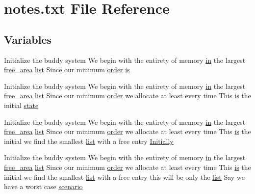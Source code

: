 \hypertarget{notes_8txt}{}\section{notes.\+txt File Reference}
\label{notes_8txt}
\subsection*{Variables}
\begin{DoxyCompactItemize}
\item 
Initialize the buddy system We begin with the entirety of memory \hyperlink{simulator_8c_aca392a8d3941cd0740aef3ad92545d67}{in} the largest \hyperlink{buddy_8c_a6d390a89d1f6c149cef6284d2c0351df}{free\+\_\+area} \hyperlink{notes_8txt_a4ee6db26bad3dd738a9a0384595fe358}{list} Since our minimum \hyperlink{notes_8txt_ae170b788b9ce36849b8a92724a029135}{order} \hyperlink{notes_8txt_afdcba1605c13ab6a6a89a58079be00f2}{is}
\item 
Initialize the buddy system We begin with the entirety of memory \hyperlink{simulator_8c_aca392a8d3941cd0740aef3ad92545d67}{in} the largest \hyperlink{buddy_8c_a6d390a89d1f6c149cef6284d2c0351df}{free\+\_\+area} \hyperlink{notes_8txt_a4ee6db26bad3dd738a9a0384595fe358}{list} Since our minimum \hyperlink{notes_8txt_ae170b788b9ce36849b8a92724a029135}{order} we allocate at least every time This \hyperlink{notes_8txt_afdcba1605c13ab6a6a89a58079be00f2}{is} the initial \hyperlink{notes_8txt_abd9a65452f6ea6a1b99ec30c8a0ef8e4}{state}
\item 
Initialize the buddy system We begin with the entirety of memory \hyperlink{simulator_8c_aca392a8d3941cd0740aef3ad92545d67}{in} the largest \hyperlink{buddy_8c_a6d390a89d1f6c149cef6284d2c0351df}{free\+\_\+area} \hyperlink{notes_8txt_a4ee6db26bad3dd738a9a0384595fe358}{list} Since our minimum \hyperlink{notes_8txt_ae170b788b9ce36849b8a92724a029135}{order} we allocate at least every time This \hyperlink{notes_8txt_afdcba1605c13ab6a6a89a58079be00f2}{is} the initial we find the smallest \hyperlink{notes_8txt_a4ee6db26bad3dd738a9a0384595fe358}{list} with a free entry \hyperlink{notes_8txt_af94996a6cb9ce95900afa88455dbe21f}{Initially}
\item 
Initialize the buddy system We begin with the entirety of memory \hyperlink{simulator_8c_aca392a8d3941cd0740aef3ad92545d67}{in} the largest \hyperlink{buddy_8c_a6d390a89d1f6c149cef6284d2c0351df}{free\+\_\+area} \hyperlink{notes_8txt_a4ee6db26bad3dd738a9a0384595fe358}{list} Since our minimum \hyperlink{notes_8txt_ae170b788b9ce36849b8a92724a029135}{order} we allocate at least every time This \hyperlink{notes_8txt_afdcba1605c13ab6a6a89a58079be00f2}{is} the initial we find the smallest \hyperlink{notes_8txt_a4ee6db26bad3dd738a9a0384595fe358}{list} with a free entry this will be only the \hyperlink{notes_8txt_a4ee6db26bad3dd738a9a0384595fe358}{list} Say we have a worst case \hyperlink{notes_8txt_a6b7da13421790a7ae65cd85c74905636}{scenario}

\end{DoxyCompactItemize}
